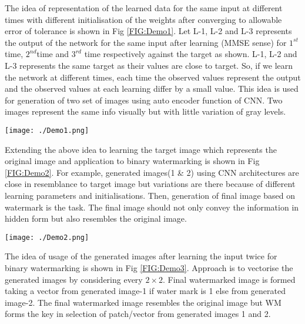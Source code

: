 The idea of representation of the learned data for the same input at different times with different initialisation of the weights after converging to allowable error of tolerance is shown in Fig \ref{FIG:Demo1}. Let L-1, L-2 and L-3 represents the output of the network for the same input after learning (MMSE sense) for $1^{st}$ time, $2^{nd}$time and $3^{rd}$ time respectively against the target as shown. L-1, L-2 and L-3 represents the same target as their values are close to target. So, if we learn the network at different times, each time the observed values represent the output and the observed values at each learning differ by a small value. This idea is used for generation of two set of images using auto encoder function of CNN. Two images represent the same info visually but with little variation of gray levels.\\

\begin{figure*}
\centering
\texttt{[image: ./Demo1.png]}
\caption{Basic idea of representation of learned data}
\label{FIG:Demo1}

\end{figure*}

Extending the above idea to learning the target image which represents the original image and application to binary watermarking is shown in Fig \ref{FIG:Demo2}. For example, generated images(1 \& 2) using CNN architectures are close in resemblance to target image but variations are there because of different learning parameters and initialisations. Then, generation of final image based on watermark is the task. The final image should not only convey the information in hidden form but also resembles the original image.

\begin{figure*}
\centering
\texttt{[image: ./Demo2.png]}
\caption{Basic idea of representation of learned image data}
\label{FIG:Demo2}

\end{figure*}

The idea of usage of the generated images after learning the input twice for binary watermarking is shown in Fig \ref{FIG:Demo3}. Approach is to vectorise the generated images by considering every $2\times2$. Final watermarked image is formed taking a vector from generated image-1 if water mark is 1 else from  generated image-2.  The final watermarked image resembles the original image but WM forms the key in selection of patch/vector from generated images 1 and 2.

